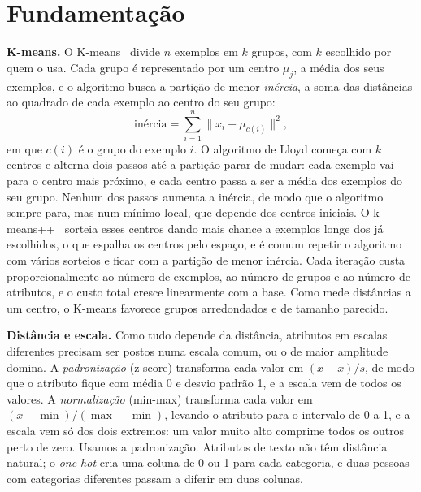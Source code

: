 \section{Fundamentação}

\textbf{K-means.} O K-means~\cite{lloyd:82,macqueen:67} divide $n$ exemplos em $k$ grupos, com $k$ escolhido por quem o usa. Cada grupo é representado por um centro $\mu_j$, a média dos seus exemplos, e o algoritmo busca a partição de menor \emph{inércia}, a soma das distâncias ao quadrado de cada exemplo ao centro do seu grupo:
\begin{equation*}
  \text{inércia} = \sum_{i=1}^{n} \lVert x_i - \mu_{c(i)} \rVert^2 ,
\end{equation*}
em que $c(i)$ é o grupo do exemplo $i$. O algoritmo de Lloyd começa com $k$ centros e alterna dois passos até a partição parar de mudar: cada exemplo vai para o centro mais próximo, e cada centro passa a ser a média dos exemplos do seu grupo. Nenhum dos passos aumenta a inércia, de modo que o algoritmo sempre para, mas num mínimo local, que depende dos centros iniciais. O k-means++~\cite{arthur:07} sorteia esses centros dando mais chance a exemplos longe dos já escolhidos, o que espalha os centros pelo espaço, e é comum repetir o algoritmo com vários sorteios e ficar com a partição de menor inércia. Cada iteração custa proporcionalmente ao número de exemplos, ao número de grupos e ao número de atributos, e o custo total cresce linearmente com a base. Como mede distâncias a um centro, o K-means favorece grupos arredondados e de tamanho parecido.

\textbf{Distância e escala.} Como tudo depende da distância, atributos em escalas diferentes precisam ser postos numa escala comum, ou o de maior amplitude domina. A \emph{padronização} (z-score) transforma cada valor em $(x - \bar{x})/s$, de modo que o atributo fique com média 0 e desvio padrão 1, e a escala vem de todos os valores. A \emph{normalização} (min-max) transforma cada valor em $(x - \min)/(\max - \min)$, levando o atributo para o intervalo de 0 a 1, e a escala vem só dos dois extremos: um valor muito alto comprime todos os outros perto de zero. Usamos a padronização. Atributos de texto não têm distância natural; o \emph{one-hot} cria uma coluna de 0 ou 1 para cada categoria, e duas pessoas com categorias diferentes passam a diferir em duas colunas.

